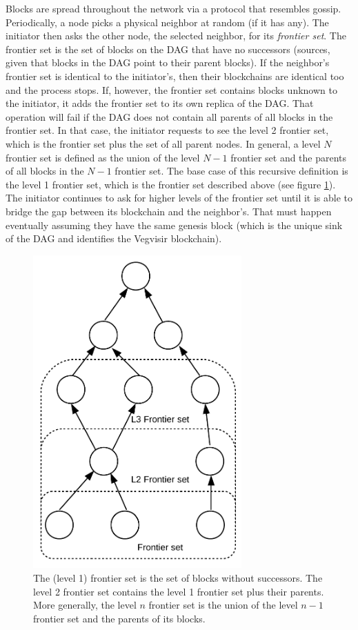 \documentclass[conference, letterpaper]{IEEEtran}
\begin{document}
Blocks are spread throughout the network via a protocol that resembles gossip.
Periodically, a node picks a physical neighbor at random (if it has any). The initiator then asks the other node, the selected neighbor, for its \emph{frontier set}. The frontier set is the set of blocks on the DAG that have no successors (sources, given that blocks in the DAG point to their parent blocks). If the neighbor's frontier set is identical to the initiator's, then their blockchains are identical too and the process stops. If, however, the frontier set contains blocks unknown to the initiator, it adds the frontier set to its own replica of the DAG. That operation will fail if the DAG does not contain all parents of all blocks in the frontier set. In that case, the initiator requests to see the level 2 frontier set, which is the frontier set plus the set of all parent nodes. In general, a level $N$ frontier set is defined as the union of the level $N-1$ frontier set and the parents of all blocks in the $N-1$ frontier set. The base case of this recursive definition is the level 1 frontier set, which is the frontier set described above (see figure \ref{fig:frontierset}). The initiator continues to ask for higher levels of the frontier set until it is able to bridge the gap between its blockchain and the neighbor's. That must happen eventually assuming they have the same genesis block (which is the unique sink of the DAG and identifies the Vegvisir blockchain).

\begin{figure}
\centering
\includegraphics[width=8cm]{frontierset}
\caption{The (level 1) frontier set is the set of blocks without successors. The level 2 frontier set contains the level 1 frontier set plus their parents. More generally, the level $n$ frontier set is the union of the level $n-1$ frontier set and the parents of its blocks.}
\label{fig:frontierset}
\end{figure}
\end{document}
